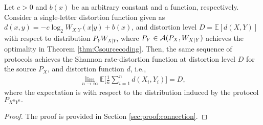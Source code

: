 \begin{theorem}\label{thm:connection}
    Let $c>0$ and $b(x)$ be an arbitrary constant and a function, respectively. Consider a single-letter distortion function given as $d(x,y)= -c\log_2 W_{X|Y}(x|y)+b(x)$,
and distortion level $D={\mathbb{E}[d(X,Y)]}$ with respect to distribution $P_{Y}W_{X|Y}$, where $P_{Y} \in \mathcal{A}(P_X,W_{X|Y})$ achieves the optimality in Theorem \ref{thm:Csourcecoding}. 
Then, the same sequence of protocols achieves the Shannon rate-distortion function at distortion level $D$ for the source $P_X$, and distortion function $d$, i.e., 
\vspace{-5pt}
\begin{align*}
    \lim_{n \rightarrow \infty} \!\mathbb{E} \bigg[\!\frac{1}{n} \!\sum_{i=1}^n d(X_i,Y_i)\!\bigg] \!=D,
\end{align*}
where the expectation is with respect to the distribution induced by the protocol $P_{X^nY^n}.$
\end{theorem}
\begin{proof}
    The proof is provided in Section \ref{sec:proof:connection}.
\end{proof}










